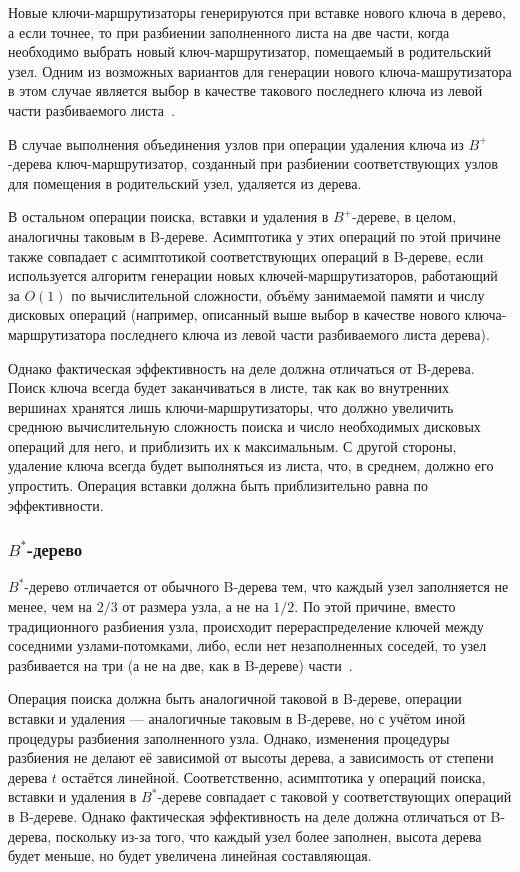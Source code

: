 \documentclass[a4paper,12pt]{article}
\begin{document}
	Новые ключи-маршрутизаторы генерируются при вставке нового ключа в дерево, а если точнее, то при разбиении заполненного листа на две части, когда необходимо выбрать новый ключ-маршрутизатор, помещаемый в родительский узел. Одним из возможных вариантов для генерации нового ключа-машрутизатора в этом случае является выбор в качестве такового последнего ключа из левой части разбиваемого листа~\cite{Kerttu}.
	
	В случае выполнения объединения узлов при операции удаления ключа из $B^+$-дерева ключ-маршрутизатор, созданный при разбиении соответствующих узлов для помещения в родительский узел, удаляется из дерева.
	
	В остальном операции поиска, вставки и удаления в $B^+$-дереве, в целом, аналогичны таковым в B-дереве. Асимптотика у этих операций по этой причине также совпадает с асимптотикой соответствующих операций в B-дереве, если используется алгоритм генерации новых ключей-маршрутизаторов, работающий за $O(1)$ по вычислительной сложности, объёму занимаемой памяти и числу дисковых операций (например, описанный выше выбор в качестве нового ключа-маршрутизатора последнего ключа из левой части разбиваемого листа дерева).
	
	Однако фактическая эффективность на деле должна отличаться от B-дерева. Поиск ключа всегда будет заканчиваться в листе, так как во внутренних вершинах хранятся лишь ключи-маршрутизаторы, что должно увеличить среднюю вычислительную сложность поиска и число необходимых дисковых операций для него, и приблизить их к максимальным. С другой стороны, удаление ключа всегда будет выполняться из листа, что, в среднем, должно его упростить. Операция вставки должна быть приблизительно равна по эффективности.
	
	\subsubsection{$B^*$-дерево}
	
	$B^*$-дерево отличается от обычного B-дерева тем, что каждый узел заполняется не менее, чем на $2/3$ от размера узла, а не на $1/2$. По этой причине, вместо традиционного разбиения узла, происходит перераспределение ключей между соседними узлами-потомками, либо, если нет незаполненных соседей, то узел разбивается на три (а не на две, как в B-дереве) части~\cite{Nist}.
	
	Операция поиска должна быть аналогичной таковой в B-дереве, операции вставки и удаления --- аналогичные таковым в B-дереве, но с учётом иной процедуры разбиения заполненного узла. Однако, изменения процедуры разбиения не делают её зависимой от высоты дерева, а зависимость от степени дерева $t$ остаётся линейной. Соответственно, асимптотика у операций поиска, вставки и удаления в $B^*$-дереве совпадает с таковой у соответствующих операций в B-дереве. Однако фактическая эффективность на деле должна отличаться от B-дерева, поскольку из-за того, что каждый узел более заполнен, высота дерева будет меньше, но будет увеличена линейная составляющая.
	
\end{document}
